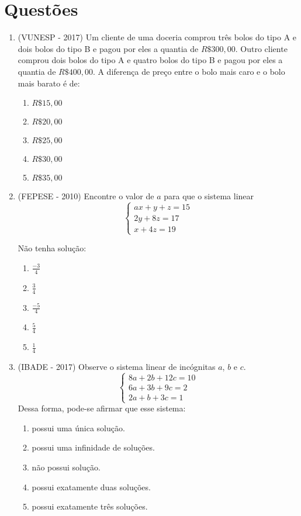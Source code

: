 \section{Questões}

\begin{enumerate}
 \item (VUNESP - 2017) Um cliente de uma doceria comprou três bolos do tipo A e dois bolos do tipo B e pagou por eles a quantia de $R\$ 300,00$. Outro cliente comprou dois bolos do tipo A e quatro bolos do tipo B e pagou por eles a quantia de $R\$ 400,00$. A diferença de preço entre o bolo mais caro e o bolo mais barato é de:
 \begin{enumerate}
 \item $R\$ 15,00$
 \item $R\$ 20,00$
 \item $R\$ 25,00$
 \item $R\$ 30,00$
 \item $R\$ 35,00$
 \end{enumerate}

 \item (FEPESE - 2010) Encontre o valor de $a$ para que o sistema linear
 \[ \begin{cases}
 ax+y+z= 15 \\
 2y + 8z= 17 \\
 x + 4z= 19
 \end{cases} \]

 Não tenha solução:
 \begin{enumerate}
\item $\frac{-3}{4}$
\item $\frac{3}{4}$
\item $\frac{-5}{4}$
\item $\frac{5}{4}$
\item $\frac{1}{4}$
\end{enumerate}

 \item (IBADE - 2017) Observe o sistema linear de incógnitas $a$, $b$ e $c$.
 \[ \begin{cases}
 8a + 2b + 12c= 10 \\
 6a + 3b + 9c= 2 \\
 2a + b + 3c= 1
 \end{cases} \]
 Dessa forma, pode-se afirmar que esse sistema:
\begin{enumerate}
\item possui uma única solução.
\item possui uma infinidade de soluções.
\item não possui solução.
\item possui exatamente duas soluções.
\item possui exatamente três soluções.
\end{enumerate}


\end{enumerate}

